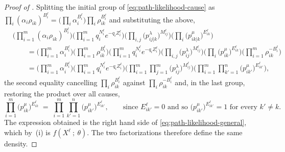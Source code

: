 \documentclass{article}
\begin{document}
\begin{proof}[Proof of ]
Splitting the initial group of \eqref{eq:path-likelihood-cause} as
$\prod_i (\alpha_i\rho_{ik})^{B^\ell_i} = \big(\prod_i \alpha_i^{B^\ell_i}\big)\prod_i
\rho_{ik}^{B^\ell_i}$ and substituting the above,
%
\begin{align*}
&\Big( \prod_{i=1}^m (\alpha_i \rho_{ik})^{B^\ell_i} \Big)
\Big( \prod_{i=1}^m q_i^{N^\ell_i} e^{-q_i Z^\ell_i} \Big)
\Big( \prod_{i,j} \big(p^\lambda_{ij|k}\big)^{M^\ell_{ij}} \Big)
\Big( \prod_{i} \big(p^\mu_{ik|k}\big)^{E^\ell_{ik}} \Big)
\\[2pt]
&\qquad =
\Big( \prod_{i=1}^m \alpha_i^{B^\ell_i} \Big)
\Big( \prod_{i=1}^m \rho_{ik}^{B^\ell_i} \Big)
\Big( \prod_{i=1}^m q_i^{N^\ell_i} e^{-q_i Z^\ell_i} \Big)
\Big( \prod_{i,j} \big(p^\lambda_{ij}\big)^{M^\ell_{ij}} \Big)
\Big( \prod_{i} \big(p^\mu_{ik}\big)^{E^\ell_{ik}} \Big)
\Big( \prod_{i=1}^m \rho_{ik}^{-B^\ell_i} \Big)
\\[2pt]
&\qquad =
\Big( \prod_{i=1}^m \alpha_i^{B^\ell_i} \Big)
\Big( \prod_{i=1}^m q_i^{N^\ell_i} e^{-q_i Z^\ell_i} \Big)
\Big( \prod_{i=1}^m \prod_{j=1}^m \big(p^\lambda_{ij}\big)^{M^\ell_{ij}} \Big)
\Big( \prod_{i=1}^m \prod_{k'=1}^n \big(p^\mu_{ik'}\big)^{E^\ell_{ik'}} \Big) ,
\end{align*}
%
the second equality cancelling $\prod_i \rho_{ik}^{B^\ell_i}$ against $\prod_i \rho_{ik}^{-B^\ell_i}$
and, in the last group, restoring the product over all causes,
%
\[
\prod_{i=1}^m \big(p^\mu_{ik}\big)^{E^\ell_{ik}}
\;=\;
\prod_{i=1}^m \prod_{k'=1}^n \big(p^\mu_{ik'}\big)^{E^\ell_{ik'}} ,
\qquad
\text{since } E^\ell_{ik'}=0 \text{ and so } \big(p^\mu_{ik'}\big)^{E^\ell_{ik'}}=1
\text{ for every } k'\neq k .
\]
%
The expression obtained is the right hand side of \eqref{eq:path-likelihood-general}, which by
\,\textup{(i)} is $f(X^\ell~;~\theta)$. The two factorizations therefore
define the same density.
\end{proof}
\end{document}
